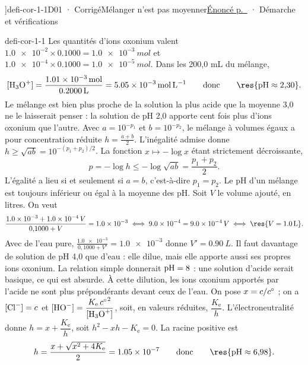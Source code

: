 \editionPage[\pdfbookmark[0]{Corrigés des défis}{bm-corriges-defis}]{defi-cor-1-1}{D01 · Corrigé}{Mélanger n'est pas moyenner}{\hyperref[defi-ex-1]{Énoncé p.~\pageref*{defi-ex-1}} · Démarche et vérifications}
\begin{blocEdition}{defi-cor-1-1}
Les quantités d'ions oxonium valent $\num{1.0e-2}\times\num{0.1000}=\qty{1,0e-3}{mol}$ et
$\num{1.0e-4}\times\num{0.1000}=\qty{1,0e-5}{mol}$. Dans les 200,0 mL du mélange,
\[\hho=\frac{\qty{1,01e-3}{mol}}{\qty{0,2000}{L}}=\qty{5,05e-3}{mol.L^{-1}}\qquad\text{donc}\qquad\res{\pH\approx2{,}30}.\]
Le mélange est bien plus proche de la solution la plus acide que la moyenne 3,0 ne le laisserait penser :
la solution de pH 2,0 apporte cent fois plus d'ions oxonium que l'autre.
Avec $a=10^{-p_1}$ et $b=10^{-p_2}$, le mélange à volumes égaux a pour concentration réduite $h=\frac{a+b}{2}$.
L'inégalité admise donne $h\geq\sqrt{ab}=10^{-(p_1+p_2)/2}$. La fonction $x\mapsto-\log x$ étant
strictement décroissante,
\[p=-\log h\leq-\log\sqrt{ab}=\frac{p_1+p_2}{2}.\]
L'égalité a lieu si et seulement si $a=b$, c'est-à-dire $p_1=p_2$. Le pH d'un mélange est toujours
inférieur ou égal à la moyenne des pH.
Soit $V$ le volume ajouté, en litres. On veut
\[\frac{\num{1.0e-3}+\num{1.0e-4}\,V}{0{,}1000+V}=\num{1.0e-3}\iff\num{9.0e-4}=\num{9.0e-4}\,V
\iff\res{V=\qty{1,0}{L}}.\]
Avec de l'eau pure, $\frac{\num{1.0e-3}}{0{,}1000+V'}=\num{1.0e-3}$ donne $V'=\qty{0,90}{L}$.
Il faut davantage de solution de pH 4,0 que d'eau : elle dilue, mais elle apporte aussi ses propres ions oxonium.
La relation simple donnerait $\mathrm{pH}=8$ : une solution d'acide serait basique, ce qui est absurde.
À cette dilution, les ions oxonium apportés par l'acide ne sont plus prépondérants devant ceux de l'eau.
On pose $x=c/c^{\circ}$ ; on a $[\ce{Cl-}]=c$ et $[\ce{HO-}]=\dfrac{K_\mathrm{e}\,{\cst}^2}{\hho}$, soit, en valeurs
réduites, $\dfrac{K_\mathrm{e}}{h}$. L'électroneutralité donne $h=x+\dfrac{K_\mathrm{e}}{h}$, soit
$h^2-xh-K_\mathrm{e}=0$. La racine positive est
\[h=\frac{x+\sqrt{x^2+4K_\mathrm{e}}}{2}=\num{1.05e-7}\qquad\text{donc}\qquad\res{\pH\approx6{,}98}.\]
\end{blocEdition}

